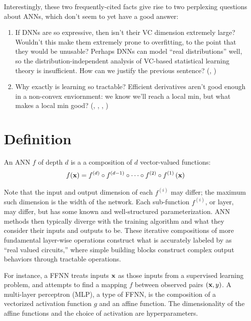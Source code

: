 \documentclass{article}
\begin{document}
Interestingly, these two frequently-cited facts give rise to two perplexing questions about ANNs, which don't seem to yet have a good answer:
\begin{enumerate}
\item If DNNs are so expressive, then isn't their VC dimension extremely large? Wouldn't this make them extremely prone to overfitting, to the point that they would be unusable? Perhaps DNNs can model ``real distributions'' well, so the distribution-independent analysis of VC-based statistical learning theory is insufficient. How can we justify the previous sentence? (, )
\item Why exactly is learning so tractable? Efficient derivatives aren't good enough in a non-convex enviornment: we know we'll reach a local min, but what makes a local min good? (, , , )
\end{enumerate}

\section{Definition}

An ANN $f$ of depth $d$ is a a composition of $d$ vector-valued functions:
$$
f(\textbf{x})=f^{(d)}\circ f^{(d-1)}\circ\cdots\circ f^{(2)}\circ f^{(1)}\left({\textbf{x}}\right)
$$

Note that the input and output dimension of each $f^{(i)}$ may differ; the maximum such dimension is the width of the network. Each sub-function $f^{(i)}$, or layer, may differ, but has some known and well-structured parameterization. ANN methods then typically diverge with the training algorithm and what they consider their inputs and outputs to be. These iterative compositions of more fundamental layer-wise operations construct what is accurately labeled by  as ``real valued circuits,'' where simple building blocks construct complex output behaviors through tractable operations.

For instance, a FFNN treats inputs $\textbf{x}$ as those inputs from a supervised learning problem, and attempts to find a mapping $f$ between observed pairs $(\textbf{x}, y)$. A multi-layer perceptron (MLP), a type of FFNN, is the composition of a vectorized activation function $g$ and an affine function. The dimensionality of the affine functions and the choice of activation are hyperparameters.
\end{document}
